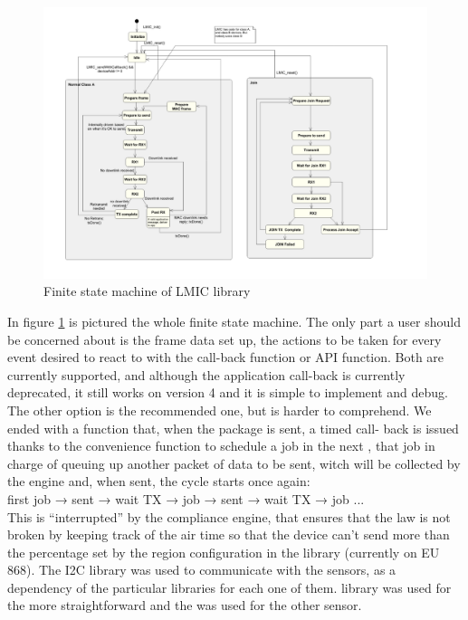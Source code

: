\begin{figure}[htbp]
\centering
\includegraphics[width=\paperwidth, angle= 90]{modelLMIC.png}
\caption{Finite state machine of LMIC library}
\label{sec:lib-finitestate}
\end{figure}
In figure \ref{sec:lib-finitestate} is pictured the whole finite state machine. The only part a user should be
concerned about is the frame data set up, the actions to be taken for
every event desired to react to with the  call-back function
or  API function. Both are currently
supported, and although the  application call-back is
currently deprecated, it still works on version 4 and it is simple to
implement and debug. The other option is the recommended one, but is
harder to comprehend.
We ended with a function that, when the package is sent, a timed call-
back is issued thanks to the convenience function
 to schedule a job in the next
, that job in charge of queuing up another packet of data
to be sent, witch will be collected by the engine and, when sent, the cycle
starts once again: \\
first job → sent → wait TX → job → sent → wait TX → job ... \\
This is “interrupted” by the compliance engine, that ensures that
the law is not broken by keeping track of the air time so that the device
can't send more than the percentage set by the region configuration in the library
(currently on EU 868).
The I2C library was used to communicate with the sensors, as a
dependency of the particular libraries for each one of them.
 library was used for the more straightforward
and the  was used for the other sensor.

